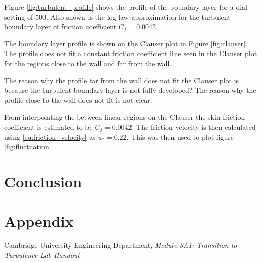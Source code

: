 \documentclass{article}
\begin{document}



Figure \ref{fig:turbulent_profile} shows the profile of the boundary layer for a dial setting of 500.
Also shown is the log law approximation for the turbulent boundary layer of friction coefficient $C_f = 0.0042$.







The boundary layer profile is shown on the Clauser plot in Figure \ref{fig:clauser}.
The profile does not fit a constant friction coefficient line seen in the Clauser plot for the regions close to the wall and far from the wall.

The reason why the profile far from the wall does not fit the Clauser plot is because the turbulent boundary layer is not fully developed?
The reason why the profile close to the wall does not fit is not clear.

From interpolating the between linear regions on the Clauser the skin friction coefficient is estimated to be $C_f = 0.0042$.
The friction velocity is then calculated using \ref{eq:friction_velocity} as $u_* = 0.22$.
This was then used to plot figure \ref{fig:fluctuation}.


\section{Conclusion}



\section{Appendix}

\begin{thebibliography}{9}
    Cambridge University Engineering Department, \textit{Module 3A1: Transition to Turbulence Lab Handout}
\end{thebibliography}
\end{document}
